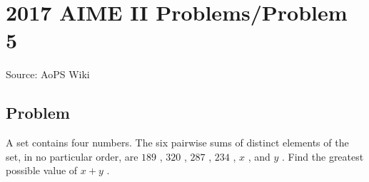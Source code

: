 \documentclass[12pt]{article}
\begin{document}
\section*{{2017 AIME II Problems/Problem 5}}
Source: AoPS Wiki

\subsection*{Problem}
A set contains four numbers. The six pairwise sums of distinct elements of the set, in no particular order, are $189$ , $320$ , $287$ , $234$ , $x$ , and $y$ . Find the greatest possible value of $x+y$ .
\end{document}
